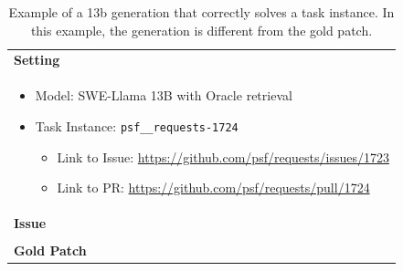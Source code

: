 \begin{table}[ht]
\caption{
Example of a \swellama{} 13b generation that correctly solves a \benchmark{} task instance.
In this example, the \swellama{} generation is different from the gold patch.
}
\label{table:appx:quality-example2}
\centering
\begin{tabular}{p{\linewidth}}
    \toprule
    \textbf{Setting} \\
    \begin{itemize}[noitemsep,topsep=0pt]
        \item Model: SWE-Llama 13B with Oracle retrieval
        \item Task Instance: \texttt{psf\_\_requests-1724}
        \begin{itemize}
            \item Link to Issue: \href{https://github.com/psf/requests/issues/1723}{https://github.com/psf/requests/issues/1723}
            \item Link to PR: \href{https://github.com/psf/requests/pull/1724}{https://github.com/psf/requests/pull/1724}
        \end{itemize}
    \end{itemize} \\
    \midrule
    \textbf{Issue} \\
     \\
    \midrule
    \textbf{Gold Patch}
     \\
    \bottomrule
\end{tabular}
\end{table}
